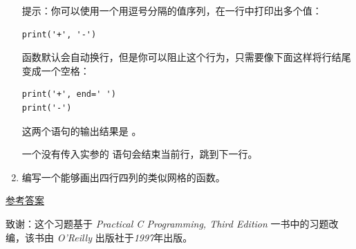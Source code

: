 \begin{exercise}
\begin{enumerate}
%
提示：你可以使用一个用逗号分隔的值序列，在一行中打印出多个值：

\begin{em}
\begin{lstlisting}
print('+', '-')
\end{lstlisting}
\end{em}

%
{\em {}} 函数默认会自动换行，但是你可以阻止这个行为，只需要像下面这样将行结尾变成一个空格：

\begin{em}
\begin{lstlisting}
print('+', end=' ')
print('-')
\end{lstlisting}
\end{em}

%
这两个语句的输出结果是 {\em {}}。

一个没有传入实参的 {\em {}} 语句会结束当前行，跳到下一行。

\item 编写一个能够画出四行四列的类似网格的函数。

\end{enumerate}


\href{http://thinkpython2.com/code/grid.py}{参考答案}


致谢：这个习题基于 {\em Practical C Programming, Third
Edition} 一书中的习题改编，该书由 {\em O’Reilly} 出版社于{\em 1997}年出版。

\end{exercise}

